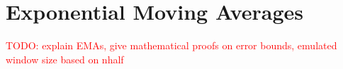 




\section{Exponential Moving Averages} \label{sec:emas}

\textcolor{red}{TODO: explain EMAs, give mathematical proofs on error bounds, emulated window size based on nhalf}

